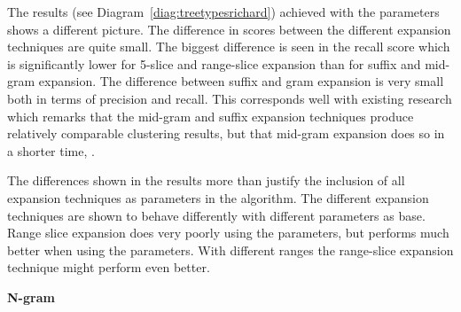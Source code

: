 
The results (see Diagram~\ref{diag:treetypesrichard}) achieved with the \citeauthor{Moe2014compact} parameters shows a different picture. The difference in scores between the different expansion techniques are quite small. The biggest difference is seen in the recall score which is significantly lower for 5-slice and range-slice expansion than for suffix and mid-gram expansion. The difference between suffix and gram expansion is very small both in terms of precision and recall. This corresponds well with existing research which remarks that the mid-gram and suffix expansion techniques produce relatively comparable clustering results, but that mid-gram expansion does so in a shorter time, \parencite{Moe2014compact}.

The differences shown in the results more than justify the inclusion of all expansion techniques as parameters in the algorithm. The different expansion techniques are shown to behave differently with different parameters as base. Range slice expansion does very poorly using the \citeauthor{Oren1998} parameters, but performs much better when using the \citeauthor{Moe2014} parameters. With different ranges the range-slice expansion technique might perform even better.

\textbf{N-gram}

